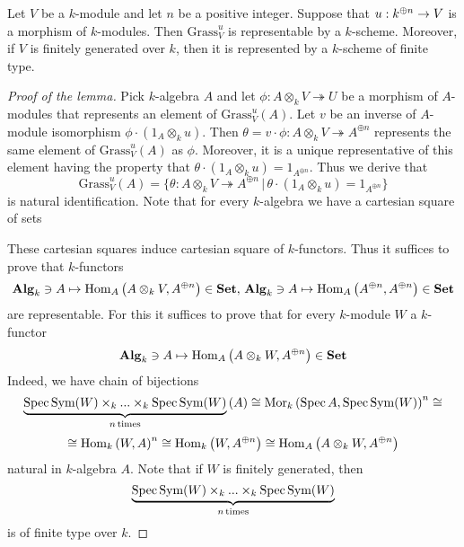 \begin{lemma}\label{lemma:representability_of_open_chart}
Let $V$ be a $k$-module and let $n$ be a positive integer. Suppose that $u:k^{\oplus n}\rightarrow V$ is a morphism of $k$-modules. Then $\mathrm{Grass}_{V}^u$ is representable by a $k$-scheme. Moreover, if $V$ is finitely generated over $k$, then it is represented by a $k$-scheme of finite type.
\end{lemma}
\begin{proof}[Proof of the lemma]
Pick $k$-algebra $A$ and let $\phi:A\otimes_kV\twoheadrightarrow U$ be a morphism of $A$-modules that represents an element of $\mathrm{Grass}_{V}^u(A)$. Let $v$ be an inverse of $A$-module isomorphism $\phi\cdot \left(1_A\otimes_ku\right)$. Then $\theta = v\cdot \phi:A\otimes_kV\twoheadrightarrow A^{\oplus n}$ represents the same element of $\mathrm{Grass}_{V}^u(A)$ as $\phi$. Moreover, it is a unique representative of this element having the property that $\theta \cdot \left(1_A\otimes_k u\right) = 1_{A^{\oplus n}}$. Thus we derive that
$$\mathrm{Grass}_{V}^u(A) = \big\{\theta:A\otimes_kV\twoheadrightarrow A^{\oplus n}\,\big|\,\theta\cdot \left(1_A\otimes_ku\right) = 1_{A^{\oplus n}}\big\}$$
is natural identification. Note that for every $k$-algebra we have a cartesian square of sets
\begin{center}
\end{center}
These cartesian squares induce cartesian square of $k$-functors. Thus it suffices to prove that $k$-functors
$$\mathbf{Alg}_k\ni A\mapsto \mathrm{Hom}_A\left(A\otimes_kV,A^{\oplus n}\right)\in \mathbf{Set},\,\mathbf{Alg}_k\ni A\mapsto \mathrm{Hom}_A\left(A^{\oplus n},A^{\oplus n}\right)\in \mathbf{Set}$$
are representable. For this it suffices to prove that for every $k$-module $W$ a $k$-functor
$$\mathbf{Alg}_k\ni A\mapsto \mathrm{Hom}_A\left(A\otimes_kW,A^{\oplus n}\right)\in \mathbf{Set}$$
Indeed, we have chain of bijections
$$\underbrace{\mathrm{Spec}\, \textrm{Sym}(W)\times_k ... \times_k \mathrm{Spec}\, \textrm{Sym}(W)}_{n\,\mathrm{times}}\left(A\right) \cong \mathrm{Mor}_k\left(\mathrm{Spec}\, A, \mathrm{Spec}\, \textrm{Sym}(W)\right)^n \cong$$
$$\cong \mathrm{Hom}_k\left(W,A\right)^n \cong \mathrm{Hom}_k\left(W, A^{\oplus n}\right) \cong \mathrm{Hom}_A\left(A\otimes_k W,A^{\oplus n}\right)$$
natural in $k$-algebra $A$. Note that if $W$ is finitely generated, then
$$\underbrace{\mathrm{Spec}\, \textrm{Sym}(W)\times_k ... \times_k \mathrm{Spec}\, \textrm{Sym}(W)}_{n\,\mathrm{times}}$$
is of finite type over $k$.
\end{proof}

